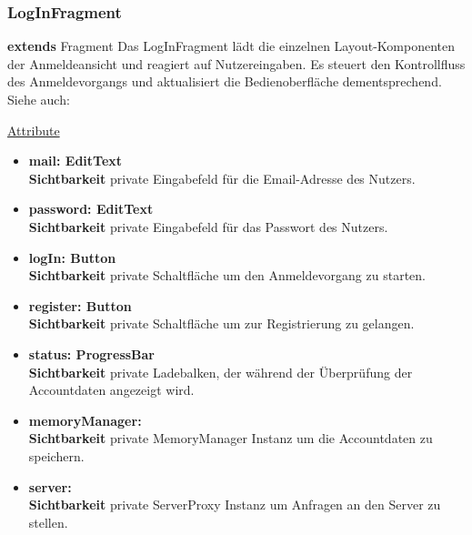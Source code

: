 \subsubsection{LogInFragment} \label{app:klasse:LogInFragment}
\textbf{extends} Fragment \newline
Das LogInFragment lädt die einzelnen Layout-Komponenten der Anmeldeansicht und reagiert auf Nutzereingaben. Es steuert den Kontrollfluss des Anmeldevorgangs und aktualisiert die Bedienoberfläche dementsprechend.
\newline
Siehe auch: \newline

\underline{Attribute}
\begin{itemize}
\itemsep0pt
\item \textbf{mail: EditText} \hfill\\ 
\textbf{Sichtbarkeit} private \newline
Eingabefeld für die Email-Adresse des Nutzers.

\item \textbf{password: EditText} \hfill\\ 
\textbf{Sichtbarkeit} private \newline
Eingabefeld für das Passwort des Nutzers.

\item \textbf{logIn: Button} \hfill\\ 
\textbf{Sichtbarkeit} private \newline
Schaltfläche um den Anmeldevorgang zu starten.

\item \textbf{register: Button} \hfill\\ 
\textbf{Sichtbarkeit} private \newline
Schaltfläche um zur Registrierung zu gelangen.

\item \textbf{status: ProgressBar} \hfill\\ 
\textbf{Sichtbarkeit} private \newline
Ladebalken, der während der Überprüfung der Accountdaten angezeigt wird.

\item \textbf{memoryManager: } \hfill\\ 
\textbf{Sichtbarkeit} private \newline
MemoryManager Instanz um die Accountdaten zu speichern.

\item \textbf{server: } \hfill\\ 
\textbf{Sichtbarkeit} private \newline
ServerProxy Instanz um Anfragen an den Server zu stellen.


\end{itemize}
